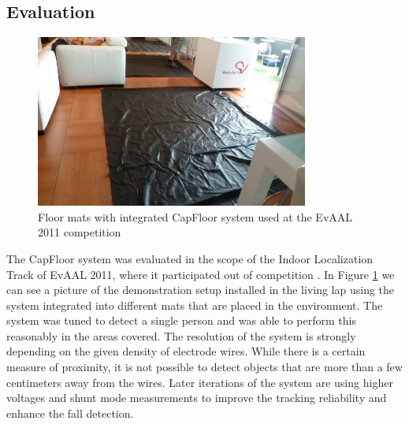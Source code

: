 \subsection{Evaluation}
\begin{figure}[h]
\centering
\includegraphics[width=0.8\textwidth]{images/capfloor_evaal}
\caption{Floor mats with integrated CapFloor system used at the EvAAL 2011 competition \cite{Braun2012CapFloor}}
\label{fig:capfloor_evaal}
\end{figure}
The CapFloor system was evaluated in the scope of the Indoor Localization Track of EvAAL 2011, where it participated out of competition \cite{chessa_eval}. In Figure \ref{fig:capfloor_evaal} we can see a picture of the demonstration setup installed in the living lap using the system integrated into different mats that are placed in the environment. The system was tuned to detect a single person and was able to perform this reasonably in the areas covered. The resolution of the system is strongly depending on the given density of electrode wires. While there is a certain measure of proximity, it is not possible to detect objects that are more than a few centimeters away from the wires. Later iterations of the system are using higher voltages and shunt mode measurements to improve the tracking reliability and enhance the fall detection.
